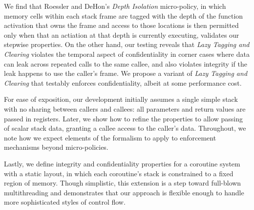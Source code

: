 \documentclass[acmsmall,review,anonymous]{acmart}\settopmatter{printfolios=true,printccs=false,printacmref=false}
\begin{document}
We find that Roessler and DeHon's {\em Depth Isolation} micro-policy, in
which memory cells within each stack frame are tagged with the depth of
the function activation that owns the frame and access to those locations is
then permitted only when that an actiation at that depth is currently executing, validates our
stepwise properties. On the other hand, our testing reveals that \emph{Lazy Tagging and Clearing}
violates the temporal aspect of confidentiality in
corner cases where data can leak across repeated calls to the same callee,
and also violates integrity if the leak happens to use the caller's frame. We
propose a variant of {\em Lazy Tagging and Clearing} that testably enforces
confidentiality, albeit at some performance cost.
%
\ifaftersubmission
{}
\fi

For ease of exposition, our development initially assumes a single simple
stack with no sharing between callers and callees: all parameters and return
values are passed in registers.  Later, we show how to refine the properties
to allow passing of scalar stack data, granting a callee access to the
caller's data. Throughout, we note how we expect elements of the formalism
to apply to enforcement mechanisms beyond micro-policies.

Lastly, we define integrity and confidentiality properties for a coroutine
system with a static layout, in which each coroutine's stack is constrained
to a fixed region of memory.  Though simplistic, this extension is a step
toward full-blown multithreading and demonstrates that our approach is flexible
enough to handle more sophisticated styles of control flow.
\end{document}
